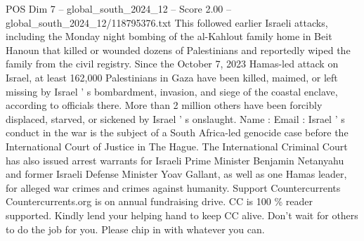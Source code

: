 \begin{textsample}{POS Dim 7 – global\_south\_2024\_12 – Score 2.00 – global\_south\_2024\_12/118795376.txt}
This followed earlier Israeli attacks, including the Monday night bombing of the al-Kahlout family home in Beit Hanoun that killed or wounded dozens of Palestinians and reportedly wiped the family from the civil registry.
Since the October 7, 2023 Hamas-led attack on Israel, at least 162,000 Palestinians in Gaza have been killed, maimed, or left missing by Israel ' s bombardment, invasion, and siege of the coastal enclave, according to officials there.
More than 2 million others have been forcibly displaced, starved, or sickened by Israel ' s onslaught.
Name : Email : Israel ' s conduct in the war is the subject of a South Africa-led genocide case before the International Court of Justice in The Hague.
The International Criminal Court has also issued arrest warrants for Israeli Prime Minister Benjamin Netanyahu and former Israeli Defense Minister Yoav Gallant, as well as one Hamas leader, for alleged war crimes and crimes against humanity.
Support Countercurrents Countercurrents.org is on annual fundraising drive.
CC is 100 \% reader supported.
Kindly lend your helping hand to keep CC alive.
Don't wait for others to do the job for you.
Please chip in with whatever you can.

\end{textsample}

